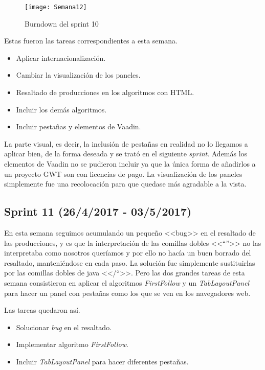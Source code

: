 \begin{figure}[h]
\centering
\texttt{[image: Semana12]}
\caption{Burndown del sprint 10}
\label{fig:A.9}
\end{figure}

Estas fueron las tareas correspondientes a esta semana.

\begin{itemize}
\item Aplicar internacionalización.
\item Cambiar la visualización de los paneles.
\item Resaltado de producciones en los algoritmos con HTML.
\item Incluir los demás algoritmos.
\item Incluir pestañas y elementos de Vaadin.
\end{itemize}

La parte visual, es decir, la inclusión de pestañas en realidad no lo llegamos a aplicar bien, de la forma deseada y se trató en el siguiente \emph{sprint}. Además los elementos de Vaadin no se pudieron incluir ya que la única forma de añadirlos a un proyecto GWT son con licencias de pago. La visualización de los paneles simplemente fue una recolocación para que quedase más agradable a la vista.


\subsection{Sprint 11 (26/4/2017 - 03/5/2017)}

En esta semana seguimos acumulando un pequeño <<bug>> en el resaltado de las producciones, y es que la interpretación de las comillas dobles <<``''>> no las interpretaba como nosotros queríamos y por ello no hacía un buen borrado del resaltado, manteniéndose en cada paso. La solución fue simplemente sustituirlas por las comillas dobles de java <</``>>. Pero las dos grandes tareas de esta semana consistieron en aplicar el algoritmos \emph{FirstFollow} y un \emph{TabLayoutPanel} para hacer un panel con pestañas como los que se ven en los navegadores web.

Las tareas quedaron así.

\begin{itemize}
\item Solucionar \emph{bug} en el resaltado.
\item Implementar algoritmo \emph{FirstFollow}.
\item Incluir \emph{TabLayoutPanel} para hacer diferentes pestañas.
\end{itemize}

